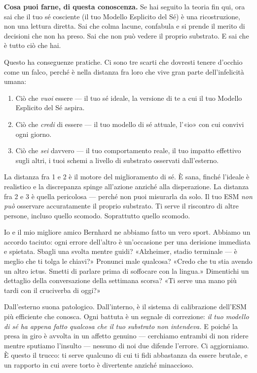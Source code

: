 \documentclass[11pt, twoside, openright]{book}
\begin{document}
\textbf{Cosa puoi farne, di questa conoscenza.} Se hai seguito la teoria fin qui, ora sai che il tuo sé cosciente (il tuo Modello Esplicito del Sé) è una ricostruzione, non una lettura diretta. Sai che colma lacune, confabula e si prende il merito di decisioni che non ha preso. Sai che non può vedere il proprio substrato. E sai che è tutto ciò che hai.

Questo ha conseguenze pratiche. Ci sono tre scarti che dovresti tenere d'occhio come un falco, perché è nella distanza fra loro che vive gran parte dell'infelicità umana:

\begin{enumerate}
  \item Ciò che \textit{vuoi} essere --- il tuo sé ideale, la versione di te a cui il tuo Modello Esplicito del Sé aspira.
  \item Ciò che \textit{credi} di essere --- il tuo modello di sé attuale, l'«io» con cui convivi ogni giorno.
  \item Ciò che \textit{sei} davvero --- il tuo comportamento reale, il tuo impatto effettivo sugli altri, i tuoi schemi a livello di substrato osservati dall'esterno.
\end{enumerate}

La distanza fra 1 e 2 è il motore del miglioramento di sé. È sana, finché l'ideale è realistico e la discrepanza spinge all'azione anziché alla disperazione. La distanza fra 2 e 3 è quella pericolosa --- perché non puoi misurarla da solo. Il tuo ESM \textit{non può} osservare accuratamente il proprio substrato. Ti serve il riscontro di altre persone, incluso quello scomodo. Soprattutto quello scomodo.

Io e il mio migliore amico Bernhard ne abbiamo fatto un vero sport. Abbiamo un accordo taciuto: ogni errore dell'altro è un'occasione per una derisione immediata e spietata. Sbagli una svolta mentre guidi? «Alzheimer, stadio terminale --- è meglio che ti tolga le chiavi?» Pronunci male qualcosa? «Credo che tu stia avendo un altro ictus. Smetti di parlare prima di soffocare con la lingua.» Dimentichi un dettaglio della conversazione della settimana scorsa? «Ti serve una mano più tardi con il cruciverba di oggi?»

Dall'esterno suona patologico. Dall'interno, è il sistema di calibrazione dell'ESM più efficiente che conosca. Ogni battuta è un segnale di correzione: \textit{il tuo modello di sé ha appena fatto qualcosa che il tuo substrato non intendeva.} E poiché la presa in giro è avvolta in un affetto genuino --- cerchiamo entrambi di non ridere mentre sputiamo l'insulto --- nessuno di noi due difende l'errore. Ci aggiorniamo. È questo il trucco: ti serve qualcuno di cui ti fidi abbastanza da essere brutale, e un rapporto in cui avere torto è divertente anziché minaccioso.
\end{document}
